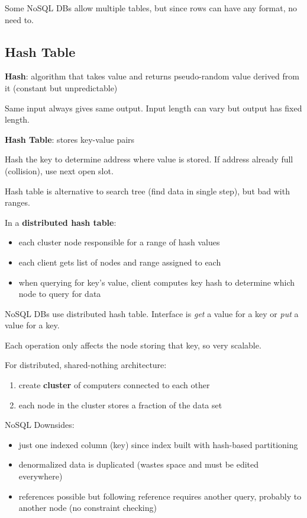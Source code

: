 \documentclass[11pt]{article}
\begin{document}
Some NoSQL DBs allow multiple tables, but since rows can have any format, no need to.
\subsection{Hash Table}
\label{sec:org1225cc8}
\textbf{Hash}: algorithm that takes value and returns pseudo-random value derived from it (constant but
unpredictable)

Same input always gives same output. Input length can vary but output has fixed length.

\textbf{Hash Table}: stores key-value pairs

Hash the key to determine address where value is stored. If address already full (collision), use next open
slot.

Hash table is alternative to search tree (find data in single step), but bad with ranges.

In a \textbf{distributed hash table}:
\begin{itemize}
\item each cluster node responsible for a range of hash values
\item each client gets list of nodes and range assigned to each
\item when querying for key's value, client computes key hash to determine which node to query
for data
\end{itemize}

NoSQL DBs use distributed hash table.
Interface is \emph{get} a value for a key or \emph{put} a value for a key.

Each operation only affects the node storing that key, so very scalable.

For distributed, shared-nothing architecture:
\begin{enumerate}
\item create \textbf{cluster} of computers connected to each other
\item each node in the cluster stores a fraction of the data set
\end{enumerate}

NoSQL Downsides:
\begin{itemize}
\item just one indexed column (key) since index built with hash-based partitioning
\item denormalized data is duplicated (wastes space and must be edited everywhere)
\item references possible but following reference requires another query, probably to another node
(no constraint checking)
\end{itemize}
\end{document}
